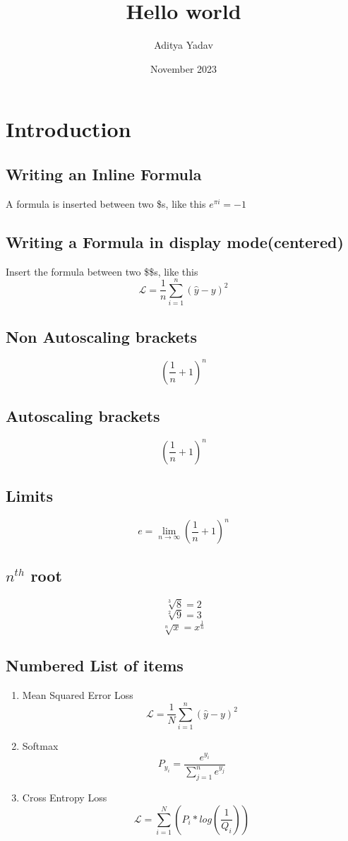 \documentclass{article}
\title{Hello world}
\author{Aditya Yadav}
\date{November 2023}
\begin{document}
\maketitle
\section{Introduction}

\subsection{Writing an Inline Formula}
A formula is inserted between two \$s, like this $e^{\pi i}=-1$

\subsection{Writing a Formula in display mode(centered)}
Insert the formula between two \$\$s, like this $$ \mathcal{L}=\frac{1}{n}\sum_{i=1}^{n}(\hat{y}-y)^2$$

\subsection{Non Autoscaling brackets}
$$(\frac{1}{n}+1)^n$$

\subsection{Autoscaling brackets}
$$\left(\frac{1}{n}+1\right)^n$$

\subsection{Limits}
$$e=\lim_{n\to\infty}\left(\frac{1}{n}+1\right)^n$$

\subsection{$n^{th}$ root}
$$\sqrt[3]{8}=2$$
$$\sqrt[2]{9}=3$$
$$\sqrt[n]{x}=x^{\frac{1}{n}}$$

\subsection{Numbered List of items}
\begin{enumerate}


\item Mean Squared Error Loss 
$$\mathcal{L}=\frac{1}{N}\sum_{i=1}^{n}(\hat{y}-y)^2$$

\item Softmax 
$$P_{y_i}=\frac{e^{y_i}}{\sum_{j=1}^{n}e^{y_j}}$$

\item Cross Entropy Loss
$$\mathcal{L}=\sum_{i=1}^{N}(P_i*log(\frac{1}{Q_i}))$$

\end{enumerate}
\end{document}
